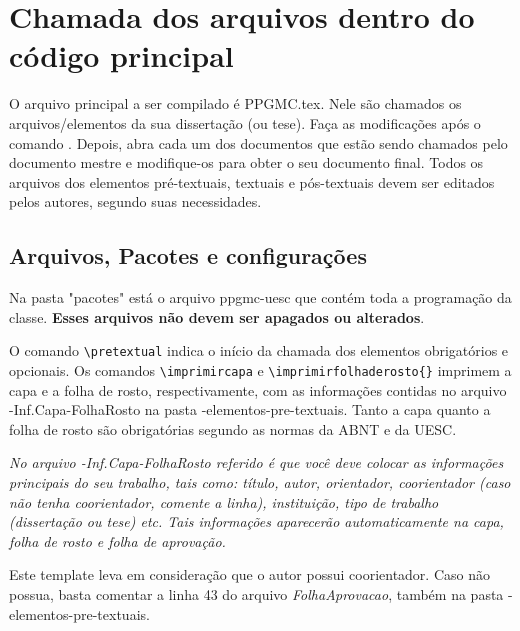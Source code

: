 \chapter{Chamada dos arquivos dentro do código principal}
O arquivo principal a ser compilado é {\ttfamily PPGMC.tex}. Nele são chamados os arquivos/elementos da sua dissertação (ou tese). Faça as modificações após o comando \verb##. Depois, abra cada um dos documentos que estão sendo chamados pelo documento mestre e modifique-os para obter o seu documento final. Todos os arquivos dos elementos pré-textuais, textuais e pós-textuais devem ser editados pelos autores, segundo suas necessidades.

\section{Arquivos, Pacotes e configurações}
Na pasta "pacotes" está o arquivo {\ttfamily ppgmc-uesc} que contém toda a programação da classe. \textbf{Esses arquivos não devem ser apagados ou alterados}.

O comando \verb#\pretextual# indica o início da chamada dos elementos obrigatórios e opcionais. Os comandos \verb#\imprimircapa# e \verb#\imprimirfolhaderosto{}# imprimem a capa e a folha de rosto, respectivamente, com as informações contidas no arquivo {-Inf.Capa-FolhaRosto} na pasta {-elementos-pre-textuais}. Tanto a capa quanto a folha de rosto são obrigatórias segundo as normas da ABNT e da UESC.

\textit{No arquivo \textit{{-Inf.Capa-FolhaRosto}} referido é que você deve colocar as informações principais do seu trabalho, tais como: título, autor, orientador, coorientador (caso não tenha coorientador, comente a linha), instituição, tipo de trabalho (dissertação ou tese) etc. Tais informações aparecerão automaticamente na capa, folha de rosto e folha de aprovação.}

Este template leva em consideração que o autor possui coorientador. Caso não possua, basta comentar a linha 43 do arquivo \textit{{\ttfamily FolhaAprovacao}}, também na pasta {-elementos-pre-textuais}.

